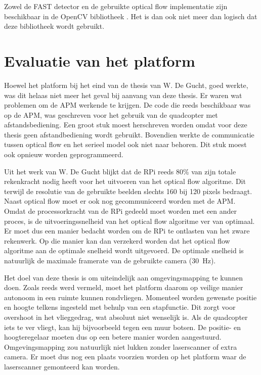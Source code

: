 \npar Zowel de FAST detector en de gebruikte optical flow implementatie zijn beschikbaar in de OpenCV bibliotheek \cite{url:opencv}. Het is dan ook niet meer dan logisch dat deze bibliotheek wordt gebruikt.

\section{Evaluatie van het platform}
Hoewel het platform bij het eind van de thesis van W. De Gucht, goed werkte, was dit helaas niet meer het geval bij aanvang van deze thesis. Er waren wat problemen om de APM werkende te krijgen. De code die reeds beschikbaar was op de APM, was geschreven voor het gebruik van de quadcopter met afstandsbediening. Een groot stuk moest herschreven worden omdat voor deze thesis geen afstandbediening wordt gebruikt. Bovendien werkte de communicatie tussen optical flow en het serieel model ook niet naar behoren. Dit stuk moest ook opnieuw worden geprogrammeerd.

\npar Uit het werk van W. De Gucht blijkt dat de RPi reeds 80\% van zijn totale rekenkracht nodig heeft voor het uitvoeren van het optical flow algoritme. Dit terwijl de resolutie van de gebruikte beelden slechts 160 bij 120 pixels bedraagt. Naast optical flow moet er ook nog gecommuniceerd worden met de APM. Omdat de processorkracht van de RPi gedeeld moet worden met een ander proces, is de uitvoeringssnelheid van het optical flow algoritme ver van optimaal. Er moet dus een manier bedacht worden om de RPi te ontlasten van het zware rekenwerk. Op die manier kan dan verzekerd worden dat het optical flow algoritme aan de optimale snelheid wordt uitgevoerd. De optimale snelheid is natuurlijk de maximale framerate van de gebruikte camera (\SI{30}{\Hz}).

\npar Het doel van deze thesis is om uiteindelijk aan omgevingsmapping te kunnen doen. Zoals reeds werd vermeld, moet het platform daarom op veilige manier autonoom in een ruimte kunnen rondvliegen. Momenteel worden gewenste positie en hoogte telkens ingesteld met behulp van een stapfunctie. Dit zorgt voor overshoot in het vlieggedrag, wat absoluut niet wenselijk is. Als de quadcopter iets te ver vliegt, kan hij bijvoorbeeld tegen een muur botsen. De positie- en hoogteregelaar moeten dus op een betere manier worden aangestuurd. Omgevingsmapping zou natuurlijk niet lukken zonder laserscanner of extra camera. Er moet dus nog een plaats voorzien worden op het platform waar de laserscanner gemonteerd kan worden.
